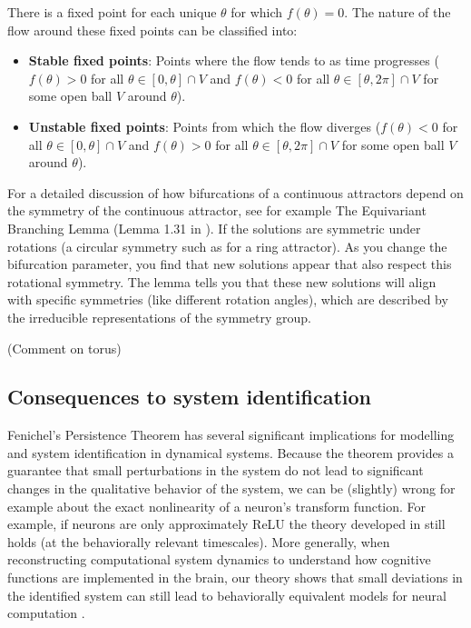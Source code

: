 \documentclass{article} %
\newcommand{\ascomment}[1]{\textcolor{ascolor}{(#1)}}
\newcounter{ct}
\theoremstyle{definition}
\theoremstyle{remark}
\begin{document}
There is a fixed point for each unique \(\theta\) for which \(f(\theta)=0\).
The nature of the flow around these fixed points can be classified into:
\begin{itemize}
\item\textbf{Stable fixed points}: Points where the flow tends to as time progresses (\(f(\theta)>0\) for all \( \theta\in[0,\theta]\cap V\) and \(f(\theta)<0\) for all \( \theta\in[\theta,2\pi]\cap V\) for some open ball \(V\) around \(\theta\)).
\item\textbf{Unstable fixed points}: Points from which the flow diverges (\(f(\theta)<0\) for all \( \theta\in[0,\theta]\cap V\) and \(f(\theta)>0\) for all \( \theta\in[\theta,2\pi]\cap V\) for some open ball \(V\) around \(\theta\)).
\end{itemize}


For a detailed discussion of how bifurcations of a continuous attractors depend on the symmetry of the continuous attractor, see for example The Equivariant Branching Lemma (Lemma 1.31 in \citep{golubitsky2002symmetry}).
If the solutions are symmetric under rotations (a circular symmetry such as for a ring attractor).
As you change the bifurcation parameter, you find that new solutions appear that also respect this rotational symmetry.
The lemma tells you that these new solutions will align with specific symmetries (like different rotation angles), which are described by the irreducible representations of the symmetry group.

\ascomment{Comment on torus}


\subsection{Consequences to system identification}
Fenichel's Persistence Theorem has several significant implications for modelling and system identification in dynamical systems.
Because the theorem provides a guarantee that small perturbations in the system do not lead to significant changes in the qualitative behavior of the system,
we can be (slightly) wrong for example about the exact nonlinearity of a neuron's transform function.
For example, if neurons are only approximately ReLU the theory developed in \citep{biswas2022geometric} still holds (at the behaviorally relevant timescales).
More generally, when reconstructing computational system dynamics to understand how cognitive functions are implemented in the brain, our theory shows that small deviations in the identified system can still lead to behaviorally equivalent models for neural computation \citep{durstewitz2023reconstructing}.
\end{document}
